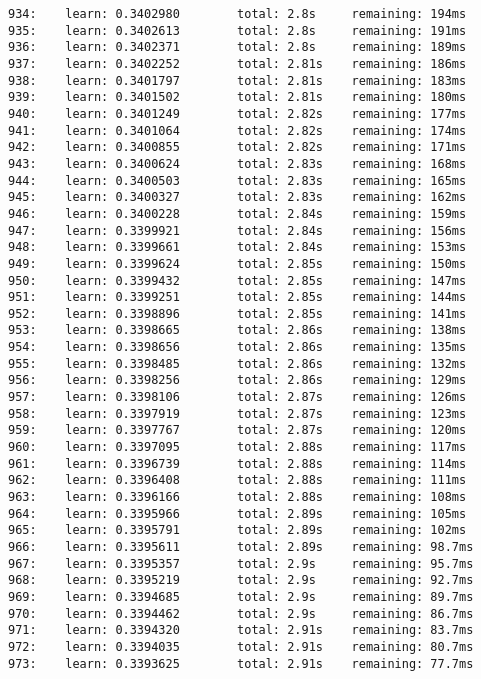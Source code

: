 \documentclass[11pt]{article}
\begin{document}
\begin{Verbatim}[commandchars=\\\{\}]
934:    learn: 0.3402980        total: 2.8s     remaining: 194ms
935:    learn: 0.3402613        total: 2.8s     remaining: 191ms
936:    learn: 0.3402371        total: 2.8s     remaining: 189ms
937:    learn: 0.3402252        total: 2.81s    remaining: 186ms
938:    learn: 0.3401797        total: 2.81s    remaining: 183ms
939:    learn: 0.3401502        total: 2.81s    remaining: 180ms
940:    learn: 0.3401249        total: 2.82s    remaining: 177ms
941:    learn: 0.3401064        total: 2.82s    remaining: 174ms
942:    learn: 0.3400855        total: 2.82s    remaining: 171ms
943:    learn: 0.3400624        total: 2.83s    remaining: 168ms
944:    learn: 0.3400503        total: 2.83s    remaining: 165ms
945:    learn: 0.3400327        total: 2.83s    remaining: 162ms
946:    learn: 0.3400228        total: 2.84s    remaining: 159ms
947:    learn: 0.3399921        total: 2.84s    remaining: 156ms
948:    learn: 0.3399661        total: 2.84s    remaining: 153ms
949:    learn: 0.3399624        total: 2.85s    remaining: 150ms
950:    learn: 0.3399432        total: 2.85s    remaining: 147ms
951:    learn: 0.3399251        total: 2.85s    remaining: 144ms
952:    learn: 0.3398896        total: 2.85s    remaining: 141ms
953:    learn: 0.3398665        total: 2.86s    remaining: 138ms
954:    learn: 0.3398656        total: 2.86s    remaining: 135ms
955:    learn: 0.3398485        total: 2.86s    remaining: 132ms
956:    learn: 0.3398256        total: 2.86s    remaining: 129ms
957:    learn: 0.3398106        total: 2.87s    remaining: 126ms
958:    learn: 0.3397919        total: 2.87s    remaining: 123ms
959:    learn: 0.3397767        total: 2.87s    remaining: 120ms
960:    learn: 0.3397095        total: 2.88s    remaining: 117ms
961:    learn: 0.3396739        total: 2.88s    remaining: 114ms
962:    learn: 0.3396408        total: 2.88s    remaining: 111ms
963:    learn: 0.3396166        total: 2.88s    remaining: 108ms
964:    learn: 0.3395966        total: 2.89s    remaining: 105ms
965:    learn: 0.3395791        total: 2.89s    remaining: 102ms
966:    learn: 0.3395611        total: 2.89s    remaining: 98.7ms
967:    learn: 0.3395357        total: 2.9s     remaining: 95.7ms
968:    learn: 0.3395219        total: 2.9s     remaining: 92.7ms
969:    learn: 0.3394685        total: 2.9s     remaining: 89.7ms
970:    learn: 0.3394462        total: 2.9s     remaining: 86.7ms
971:    learn: 0.3394320        total: 2.91s    remaining: 83.7ms
972:    learn: 0.3394035        total: 2.91s    remaining: 80.7ms
973:    learn: 0.3393625        total: 2.91s    remaining: 77.7ms

\end{Verbatim}
\end{document}
